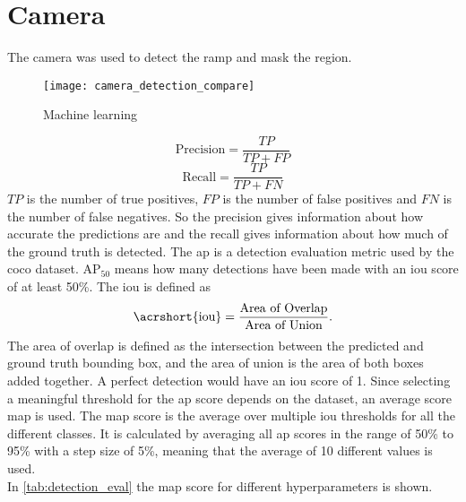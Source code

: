 \section{Camera}
The camera was used to detect the ramp and mask the region.
\begin{figure}[htbp]
	\centering
	\texttt{[image: camera\_detection\_compare]}
	\caption{Machine learning}
	\label{fig:camera_detection_compare}
\end{figure}
\begin{equation}
	\text{Precision} = \frac{TP}{TP+FP}
\end{equation}
\begin{equation}
	\text{Recall} = \frac{TP}{TP+FN}
\end{equation}
$TP$ is the number of true positives, $FP$ is the number of false positives and $FN$ is the number of false negatives.
So the precision gives information about how accurate the predictions are and the recall gives information about how much of the ground truth is detected.
The \gls{ap} is a detection evaluation metric used by the \gls{coco} dataset.
$\text{AP}_{50}$ means how many detections have been made with an \gls{iou} score of at least 50\%.
The \gls{iou} is defined as
\begin{equation}
	\text{\acrshort{iou}} = \frac{\text{Area of Overlap}}{\text{Area of Union}}.
\end{equation}
The area of overlap is defined as the intersection between the predicted and ground truth bounding box, and the area of union is the area of both boxes added together.
A perfect detection would have an \gls{iou} score of 1.
Since selecting a meaningful threshold for the \gls{ap} score depends on the dataset, an average score \gls{map} is used.
The \gls{map} score is the average over multiple \gls{iou} thresholds for all the different classes.
It is calculated by averaging all \gls{ap} scores in the range of 50\% to 95\% with a step size of 5\%, meaning that the average of 10 different values is used.\\
In \cref{tab:detection_eval} the \gls{map} score for different hyperparameters is shown.

